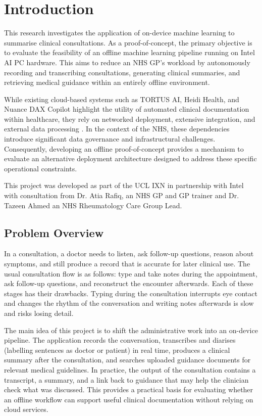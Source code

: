 \chapter{Introduction}
This research investigates the application of on-device machine learning to summarise clinical consultations. As a proof-of-concept, the primary objective is to evaluate the feasibility of an offline machine learning pipeline running on Intel AI PC hardware. This aims to reduce an NHS GP's workload by autonomously recording and transcribing consultations, generating clinical summaries, and retrieving medical guidance within an entirely offline environment. 

While existing cloud-based systems such as TORTUS AI, Heidi Health, and Nuance DAX Copilot highlight the utility of automated clinical documentation within healthcare, they rely on networked deployment, extensive integration, and external data processing \cite{tortus_product_2026,heidi_product_2026,dictationdirect_dax_features_2026}. In the context of the NHS, these dependencies introduce significant data governance and infrastructural challenges. Consequently, developing an offline proof-of-concept provides a mechanism to evaluate an alternative deployment architecture designed to address these specific operational constraints.

This project was developed as part of the UCL IXN in partnership with Intel with consultation from Dr. Atia Rafiq, an NHS GP and GP trainer and Dr. Tazeen Ahmed an NHS Rheumatology Care Group Lead.

\section{Problem Overview}
In a consultation, a doctor needs to listen, ask follow-up questions, reason about symptoms, and still produce a record that is accurate for later clinical use. The usual consultation flow is as follows: type and take notes during the appointment, ask follow-up questions, and reconstruct the encounter afterwards. Each of these stages has their drawbacks. Typing during the consultation interrupts eye contact and changes the rhythm of the conversation and writing notes afterwards is slow and risks losing detail.

The main idea of this project is to shift the administrative work into an on-device pipeline. The application records the conversation, transcribes and diarises (labelling sentences as doctor or patient) in real time, produces a clinical summary after the consultation, and searches uploaded guidance documents for relevant medical guidelines. In practice, the output of the consultation contains a transcript, a summary, and a link back to guidance that may help the clinician check what was discussed. This provides a practical basis for evaluating whether an offline workflow can support useful clinical documentation without relying on cloud services.

